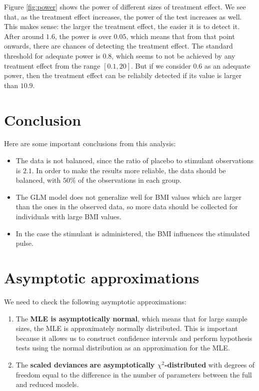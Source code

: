 \documentclass[10pt, a4paper]{article}
\begin{document}
Figure \ref{fig:power} shows the power of different sizes of treatment effect. We see that, as the treatment effect increases, the power of the test increases as well. This makes sense: the larger the treatment effect, the easier it is to detect it. After around $1.6$, the power is over $0.05$, which means that from that point onwards, there are chances of detecting the treatment effect. The standard threshold for adequate power is $0.8$, which seems to not be achieved by any treatment effect from the range $[0.1, 20]$. But if we consider $0.6$ as an adequate power, then the treatment effect can be reliabily detected if its value is larger than $10.9$.

\section{Conclusion}

Here are some important conclusions from this analysis:

\begin{itemize}
  \item The data is not balanced, since the ratio of placebo to stimulant observations is $2.1$. In order to make the results more reliable, the data should be balanced, with $50 \%$ of the observations in each group.
  \item The GLM model does not generalize well for BMI values which are larger than the ones in the observed data, so more data should be collected for individuals with large BMI values.
  \item In the case the stimulant is administered, the BMI influences the stimulated pulse.
\end{itemize}

\section{Asymptotic approximations}

We need to check the following asymptotic approximations:
\begin{enumerate}
  \item The \textbf{MLE is asymptotically normal}, which means that for large sample sizes, the MLE is approximately normally distributed. This is important because it allows us to construct confidence intervals and perform hypothesis tests using the normal distribution as an approximation for the MLE.
  \item The \textbf{scaled deviances} \textbf{are asymptotically $\chi^2$-distributed} with degrees of freedom equal to the difference in the number of parameters between the full and reduced models.
\end{enumerate}
\end{document}
